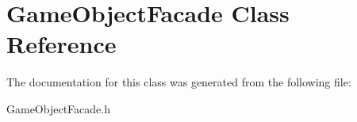 \hypertarget{class_game_object_facade}{}\section{Game\+Object\+Facade Class Reference}
\label{class_game_object_facade}


The documentation for this class was generated from the following file\+:\begin{DoxyCompactItemize}
\item 
Game\+Object\+Facade.\+h\end{DoxyCompactItemize}

